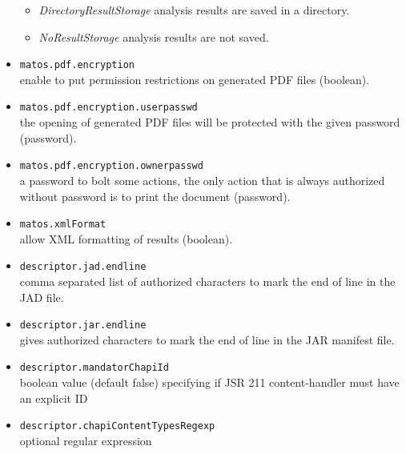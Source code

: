 \begin{itemize}
{	\begin{itemize}
      \item{\emph{DirectoryResultStorage}} analysis results are saved in a
      directory.
      \item{\emph{NoResultStorage}} analysis results are not saved.
    \end{itemize} 
}
\item{\texttt{matos.pdf.encryption}}\\ enable to put permission restrictions on
generated PDF files (boolean).
\item{\texttt{matos.pdf.encryption.userpasswd}}\\ the opening of generated PDF
files will be protected with the given password (password).
\item{\texttt{matos.pdf.encryption.ownerpasswd}}\\ a password to bolt some
actions, the only action that is always authorized without password is to print
the document (password).
\item{\texttt{matos.xmlFormat}}\\ allow XML formatting of results (boolean). 
\item{\texttt{descriptor.jad.endline}}\\ comma separated list of authorized
 characters to mark the end of line in the JAD file.
\item{\texttt{descriptor.jar.endline}}\\gives authorized characters to mark the
 end of line in the JAR manifest file.
\item{\texttt{descriptor.mandatorChapiId}}\\boolean value (default false)
 specifying if JSR 211 content-handler must have an explicit ID
\item{\texttt{descriptor.chapiContentTypesRegexp}}\\optional regular expression

\end{itemize}
